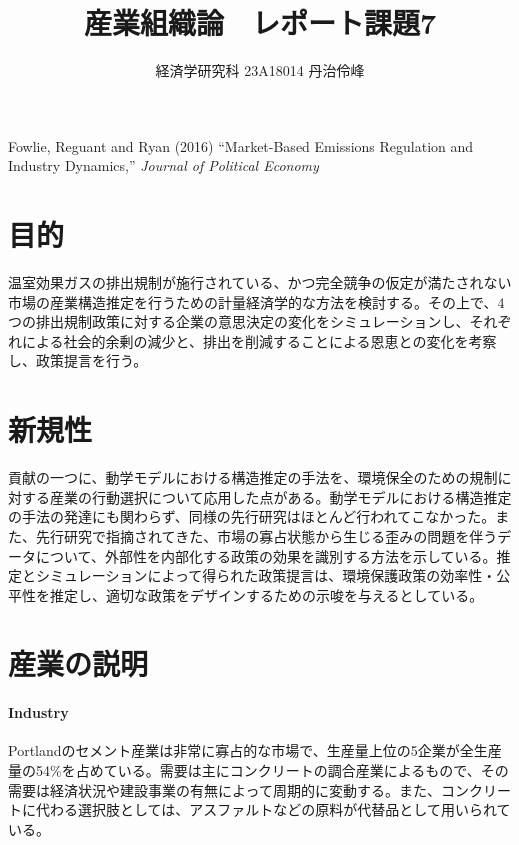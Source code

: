 \documentclass[11pt]{jsarticle}
\begin{document}
\title{産業組織論　レポート課題7}
\author{経済学研究科 23A18014 丹治伶峰}
\date{}
\maketitle

\large
Fowlie, Reguant and Ryan (2016) ``Market-Based Emissions Regulation and Industry Dynamics,'' \textit{Journal of Political Economy}

\normalsize

\section{目的}

温室効果ガスの排出規制が施行されている、かつ完全競争の仮定が満たされない市場の産業構造推定を行うための計量経済学的な方法を検討する。その上で、4つの排出規制政策に対する企業の意思決定の変化をシミュレーションし、それぞれによる社会的余剰の減少と、排出を削減することによる恩恵との変化を考察し、政策提言を行う。

\section{新規性}

貢献の一つに、動学モデルにおける構造推定の手法を、環境保全のための規制に対する産業の行動選択について応用した点がある。動学モデルにおける構造推定の手法の発達にも関わらず、同様の先行研究はほとんど行われてこなかった。また、先行研究で指摘されてきた、市場の寡占状態から生じる歪みの問題を伴うデータについて、外部性を内部化する政策の効果を識別する方法を示している。推定とシミュレーションによって得られた政策提言は、環境保護政策の効率性・公平性を推定し、適切な政策をデザインするための示唆を与えるとしている。

\section{産業の説明}

\paragraph{Industry}

Portlandのセメント産業は非常に寡占的な市場で、生産量上位の5企業が全生産量の54\%を占めている。需要は主にコンクリートの調合産業によるもので、その需要は経済状況や建設事業の有無によって周期的に変動する。また、コンクリートに代わる選択肢としては、アスファルトなどの原料が代替品として用いられている。
\end{document}
